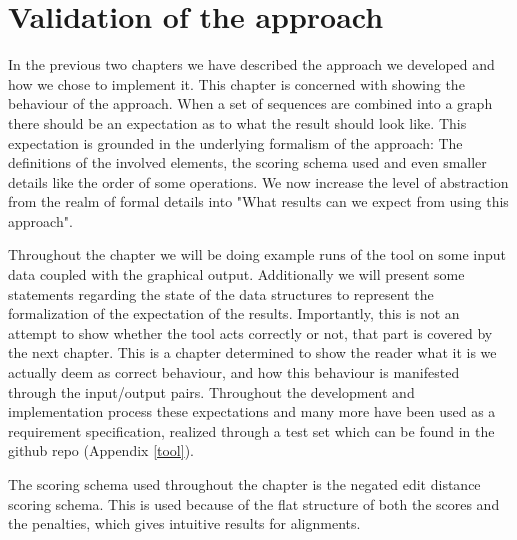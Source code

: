 \documentclass[thesis.tex]{subfiles}
\begin{document}
\chapter{Validation of the approach}
\label{sec:validation}
In the previous two chapters we have described the approach we developed and how we chose to implement it. This chapter is concerned with showing the behaviour of the approach. When a set of sequences are combined into a graph there should be an expectation as to what the result should look like. This expectation is grounded in the underlying formalism of the approach: The definitions of the involved elements, the scoring schema used and even smaller details like the order of some operations. We now increase the level of abstraction from the realm of formal details into "What results can we expect from using this approach".\\
\par\noindent
Throughout the chapter we will be doing example runs of the tool on some input data coupled with the graphical output. Additionally we will present some statements regarding the state of the data structures to represent the formalization of the expectation of the results. Importantly, this is not an attempt to show whether the tool acts correctly or not, that part is covered by the next chapter. This is a chapter determined to show the reader what it is we actually deem as correct behaviour, and how this behaviour is manifested through the input/output pairs. Throughout the development and implementation process these expectations and many more have been used as a requirement specification, realized through a test set which can be found in the github repo (Appendix \ref{tool}).\\
\par\noindent
The scoring schema used throughout the chapter is the negated edit distance scoring schema. This is used because of the flat structure of both the scores and the penalties, which gives intuitive results for alignments. 
\end{document}
